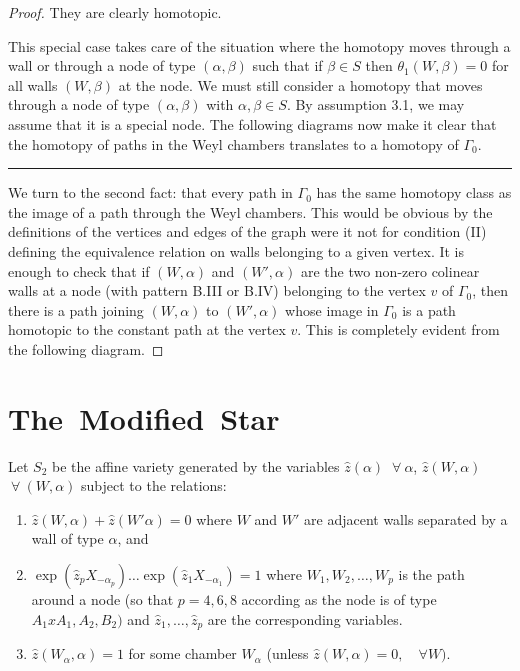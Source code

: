 \documentclass{memo-l}
\theoremstyle{definition}
\theoremstyle{remark}
\numberwithin{section}{chapter}
\numberwithin{equation}{chapter}
\begin{document}
\begin{proof}
\medskip
\medskip


\noindent
They are clearly homotopic.

   This special case takes care of the situation where the homotopy moves
through a wall or through a node of type $({\alpha},{\beta})$ such that if
${\beta}  \in  S$ then ${\theta}_{1}(W,{\beta}) = 0$ for all walls
$(W,{\beta})$ at the node.  We must still consider a homotopy that moves
through a node of type $({\alpha},{\beta})$ with ${\alpha},{\beta}  \in
S$.  By assumption  3.1, we may assume that it is a special node.  The
following diagrams now make it clear that the homotopy of paths in the Weyl
chambers translates to a homotopy of ${\Gamma}_{0}$.

\medskip
\medskip
\hrule\medskip
\medskip


We turn to the second fact: that every path in ${\Gamma}_{0}$ has the same
homotopy class as the image of a path through the Weyl chambers.  This
would be obvious by the definitions of the vertices and edges of the graph
were it not for condition (II) defining the equivalence relation on walls
belonging to a given vertex.  It is enough to check that if $(W,{\alpha})$
and $(W',{\alpha})$ are the two non-zero colinear walls at a node (with
pattern B.III or B.IV) belonging to the vertex $v$ of ${\Gamma}_{0}$,
then there is a path joining $(W,{\alpha})$ to $(W',{\alpha})$ whose image
in ${\Gamma}_{0}$ is a path homotopic to the constant path at the vertex
$v$.  This is completely evident from the following diagram.

\medskip
\medskip
\end{proof}

\section{The\ Modified\ Star}

   Let $S_{2}$ be the affine variety generated by the variables $\hat
z({\alpha})$ ${\ \forall\ } {\alpha}$, $\hat z(W,{\alpha})$ ${\ \forall\ }
(W,{\alpha})$ subject to the relations:
\begin{enumerate}[label=\roman*)]
\item $\hat z(W,{\alpha})+\hat z(W'{\alpha}) = 0$ where $W$ and $W'$ are
adjacent walls separated by a wall of type ${\alpha}$, and
\item $\exp(\hat z_{p}X_{-{\alpha}_{p}})\ldots \exp(\hat z_{1}X_{-{\alpha}_{1}})
= 1$ where $W_{1},W_{2},\ldots ,W_{p}$ is the path around
a node (so that $p = 4,6,8$ according as the node is of type $A_{1}xA_{1},
A_{2}, B_{2})$ and $\hat z_{1},\ldots ,\hat z_{p}$ are the corresponding
variables.
\item $\hat z(W_{{\alpha}},{\alpha}) = 1$
for some chamber $W_\alpha$ (unless $\hat z(W,\alpha)=0,\quad \forall W)$.
\end{enumerate}
\end{document}
